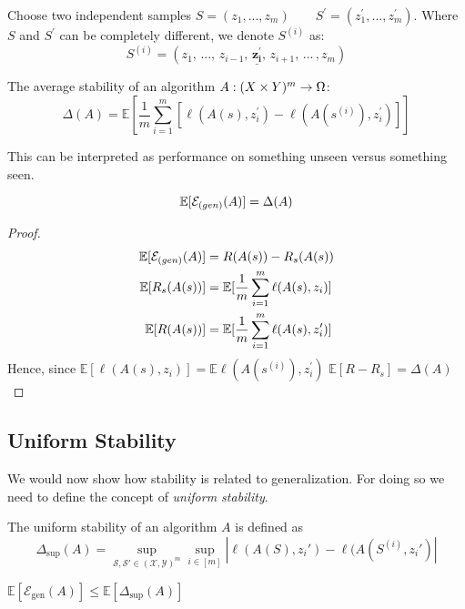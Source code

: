Choose two independent samples $S = (z_1, ... , z_m) \quad \quad  S^{\prime} = (z^{\prime}_1, ... ,z^{\prime}_{m})$. Where 
$S$ and $S^{\prime}$ can be completely different, we denote $S^{(i)}$ as:
$$S^{(i)} = (z_1, \,... ,\, z_{i-1}, \,\underline{\mathbf{z_{i}^{\prime}}},\, z_{i+1}, \,... \,,z_{m})$$
\begin{definition} The average stability of an algorithm $A: (X \times Y)^{m} \rightarrow \Omega$:
$$\Delta(A) = \mathbb{E}[\frac{1}{m}\sum_{i=1}^{m}[\ell(A(s),z_i^{\prime}) - \ell(A(s^{(i)}),z_{i}^{\prime})]]$$
\end{definition}
This can be interpreted as performance on something unseen versus something seen.
\begin{theorem}
$$\mathbb{E}[\mathcal{E}_{\text(gen)}(A)] = \Delta(A)$$
\end{theorem}
\begin{proof}
\begin{align*}
\mathbb{E}[\mathcal{E}_{\text(gen)}(A)]  &= R(A(s)) - R_{s}(A(s)) \\
\mathbb{E} [R_{s}(A(s))] &= \mathbb{E}[\frac{1}{m}\sum_{i=1}^{m}\ell(A(s),z_i)] \\
\mathbb{E} [R(A(s))]&= \mathbb{E}[\frac{1}{m}\sum_{i=1}^{m}\ell(A(s),z_i^{\prime})]
\end{align*}
Hence, since $\mathbb{E}[\ell(A(s),z_i)] = \mathbb{E}\ell(A(s^{(i)}),z_i^{\prime})$
$\mathbb{E}[R - R_s] = \Delta(A)$
\end{proof}





\subsection{Uniform Stability}
We would now show how stability is related to generalization. For doing so we need to define the concept of \textit{uniform stability}.

\begin{definition}The uniform stability of an algorithm $A$ is defined as 
\begin{equation*}
\Delta_{\sup} (A) = \sup_{\mathcal{S}, \mathcal{S}' \in ( \mathcal{X}, \mathcal{Y} )^m } \sup_{i \in [m]} |\ell(A(S), z_i') - \ell(A(S^{(i)}, z_i')|
\end{equation*}
\end{definition}

\begin{corollary}
    $\mathbb{E}[\mathcal{E}_{\text{gen}}(A)] \leq \mathbb{E}[\Delta_{\sup} (A)]$
\end{corollary}

